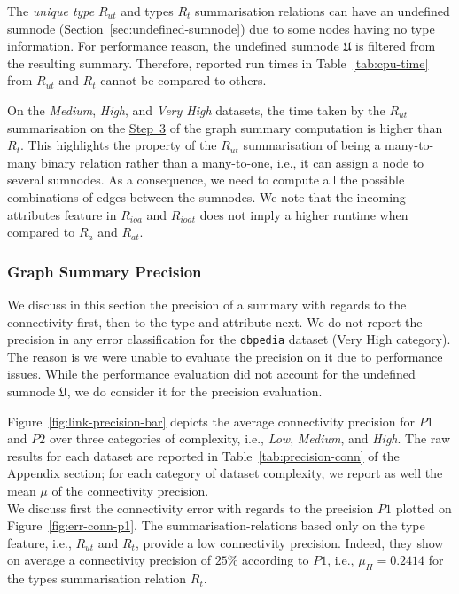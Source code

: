 The \emph{unique type} $R_{ut}$ and types $R_t$ summarisation relations can have an undefined sumnode (Section~\ref{sec:undefined-sumnode}) due to some nodes having no type information. For performance reason, the undefined sumnode $\mathfrak{U}$ is filtered from the resulting summary. Therefore, reported run times in Table~\ref{tab:cpu-time} from $R_{ut}$ and $R_t$ cannot be compared to others.

On the \emph{Medium}, \emph{High}, and \emph{Very High} datasets, the time taken by the $R_{ut}$ summarisation on the \hyperref[step-he]{Step~3} of the graph summary computation is higher than $R_t$. This highlights the property of the $R_{ut}$ summarisation of being a many-to-many binary relation rather than a many-to-one, i.e., it can assign a node to several sumnodes. As a consequence, we need to compute all the possible combinations of edges between the sumnodes.
We note that the \gls{incoming-attributes} feature in $R_{ioa}$ and $R_{ioat}$ does not imply a higher runtime when compared to $R_{a}$ and $R_{at}$.



\subsubsection{Graph Summary Precision}

We discuss in this section the precision of a summary with regards to the \gls{connectivity} first, then to the \gls{type} and \gls{attribute} next. We do not report the precision in any error classification for the \texttt{dbpedia} dataset (Very High category). The reason is we were unable to evaluate the precision on it due to performance issues. While the performance evaluation did not account for the undefined sumnode $\mathfrak{U}$, we do consider it for the precision evaluation.


Figure~\ref{fig:link-precision-bar} depicts the average connectivity precision for $P1$ and $P2$ over three categories of complexity, i.e., \emph{Low}, \emph{Medium}, and \emph{High}. The raw results for each dataset are reported in Table~\ref{tab:precision-conn} of the Appendix section; for each category of dataset complexity, we report as well the mean $\mu$ of the connectivity precision.\\

We discuss first the connectivity error with regards to the precision $P1$ plotted on Figure~\ref{fig:err-conn-p1}.
The \glspl{summarisation-relation} based only on the type feature, i.e., $R_{ut}$ and $R_t$, provide a low connectivity precision. Indeed, they show on average a connectivity precision of $25\%$ according to $P1$, i.e., $\mu_H=0.2414$ for the types summarisation relation $R_t$.

